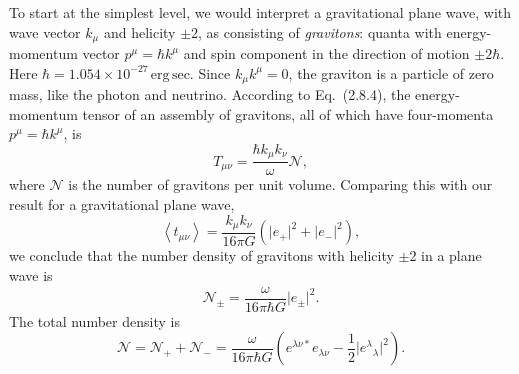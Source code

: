 To start at the simplest level, we would interpret a gravitational plane wave,
with wave vector \(k_\mu\) and helicity \(\pm2\), as consisting of
\emph{gravitons}: quanta with energy-momentum vector
\(p^\mu=\hbar k^\mu\) and spin component in the direction of motion
\(\pm2\hbar\). Here
\(\hbar=1.054\times10^{-27}\,\mathrm{erg\,sec}\). Since
\(k_\mu k^\mu=0\), the graviton is a particle of zero mass, like the photon
and neutrino. According to Eq.~(2.8.4), the energy-momentum tensor of an
assembly of gravitons, all of which have four-momenta
\(p^\mu=\hbar k^\mu\), is
\begin{equation}
  T_{\mu\nu}
  =
  \frac{\hbar k_\mu k_\nu}{\omega}\mathcal{N},
  \tag{10.8.1}\label{eq:10.8.1}
\end{equation}
where \(\mathcal{N}\) is the number of gravitons per unit volume. Comparing
this with our result for a gravitational plane wave,
\begin{equation}
  \left\langle t_{\mu\nu}\right\rangle
  =
  \frac{k_\mu k_\nu}{16\pi G}
  \left(
    \lvert e_+\rvert^2+\lvert e_-\rvert^2
  \right),
  \tag{10.8.2}\label{eq:10.8.2}
\end{equation}
we conclude that the number density of gravitons with helicity \(\pm2\) in
a plane wave is
\begin{equation}
  \mathcal{N}_\pm
  =
  \frac{\omega}{16\pi\hbar G}\lvert e_\pm\rvert^2.
  \tag{10.8.3}\label{eq:10.8.3}
\end{equation}
The total number density is
\begin{equation}
  \mathcal{N}
  =
  \mathcal{N}_++\mathcal{N}_-
  =
  \frac{\omega}{16\pi\hbar G}
  \left(
    e^{\lambda\nu*}e_{\lambda\nu}
    -\frac12\lvert e^\lambda{}_\lambda\rvert^2
  \right).
  \tag{10.8.4}\label{eq:10.8.4}
\end{equation}

